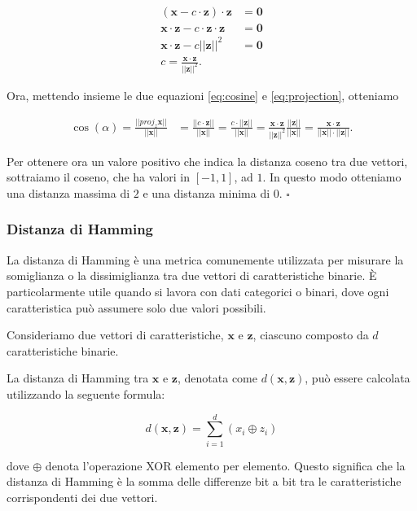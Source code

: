 \begin{align}
(\mathbf x - c \cdot \mathbf z) \cdot \mathbf z &= \mathbf 0\\
\mathbf x \cdot \mathbf z - c \cdot \mathbf z \cdot \mathbf z &=\mathbf 0\\
\mathbf x \cdot \mathbf z - c ||\mathbf z||^2 &= \mathbf 0\\
c = \frac{\mathbf x \cdot \mathbf z}{||\mathbf z||^2}.
\label{eq:projection}
\end{align}

Ora, mettendo insieme le due equazioni \eqref{eq:cosine} e \eqref{eq:projection}, otteniamo

\begin{align*}
\cos(\alpha) = \frac{||proj_z \mathbf x||}{||\mathbf x||} &= 
\frac{||c \cdot \mathbf z||}{||\mathbf x||} = \frac{c \cdot ||\mathbf z||}{||\mathbf x||}=
\frac{\mathbf x \cdot \mathbf z }{||\mathbf z||^2} \frac{||\mathbf z||}{||\mathbf x||}=
\frac{\mathbf x \cdot \mathbf z}{||\mathbf x|| \cdot ||\mathbf z||}.
\end{align*}

Per ottenere ora un valore positivo che indica la distanza coseno tra due vettori, sottraiamo il coseno,
che ha valori in $[-1, 1]$, ad $1$. In questo modo otteniamo una distanza massima di $2$ e una distanza minima
di $0$.
$\square$

\subsubsection{Distanza di Hamming}
La distanza di Hamming è una metrica comunemente utilizzata per misurare la somiglianza o la dissimiglianza tra due vettori di caratteristiche binarie. È particolarmente utile quando si lavora con dati categorici o binari, dove ogni caratteristica può assumere solo due valori possibili.

Consideriamo due vettori di caratteristiche, $\mathbf{x}$ e $\mathbf{z}$, 
ciascuno composto da $d$ caratteristiche binarie.

La distanza di Hamming tra $\mathbf{x}$ e $\mathbf{z}$, denotata come $d(\mathbf{x}, \mathbf{z})$, può essere calcolata utilizzando la seguente formula:

\[
d(\mathbf{x}, \mathbf{z}) = \sum_{i=1}^{d} (x_i \oplus z_i)
\]

dove $\oplus$ denota l'operazione XOR elemento per elemento. Questo significa che la distanza di Hamming è la somma delle differenze bit a bit tra le caratteristiche corrispondenti dei due vettori.

